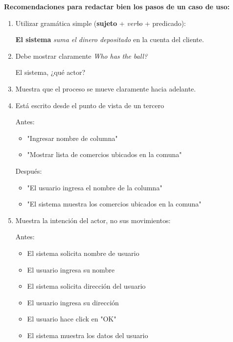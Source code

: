         \newpage
        \textbf{Recomendaciones para redactar bien los pasos de un caso de uso:}
        
    \begin{enumerate}
        \item Utilizar gramática simple (\textbf{sujeto} + \textit{verbo} + predicado):
        
        \textbf{El sistema} \textit{suma el dinero depositado} en la cuenta del cliente.
        
        \item Debe mostrar claramente \textit{Who has the ball?}
        
        El sistema, ¿qué actor?
        
        \item Muestra que el proceso se mueve claramente hacia adelante.
        \item Está escrito desde el punto de vista de un tercero
        
            Antes:
            \begin{itemize}
                \item "Ingresar nombre de columna"
                \item "Mostrar lista de comercios ubicados en la comuna"
            \end{itemize}
            Después:
            \begin{itemize}
                \item "El usuario ingresa el nombre de la columna"
                \item "El sistema muestra los comercios ubicados en la comuna"
            \end{itemize}
            
        \item Muestra la intención del actor, no sus movimientos:
        
        Antes:
        
        \begin{itemize}
            \item El sistema solicita nombre de usuario
            \item El usuario ingresa su nombre
            \item El sistema solicita dirección del usuario
            \item El usuario ingresa su dirección
            \item El usuario hace click en "OK"
            \item El sistema muestra los datos del usuario
        \end{itemize}
        

\end{enumerate}
